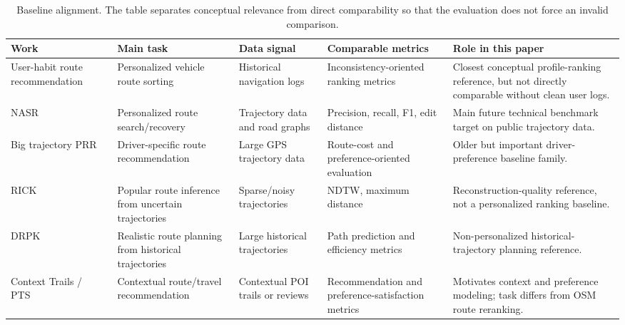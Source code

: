 \begin{table}[t]
  \centering
  \caption{Baseline alignment. The table separates conceptual relevance from direct comparability so that the evaluation does not force an invalid comparison.}
  \label{tab:baseline_alignment}
  \begin{tabular}{p{}p{}p{}p{}p{}}
    \toprule
    Work & Main task & Data signal & Comparable metrics & Role in this paper \\
    \midrule
    User-habit route recommendation~\cite{userhabits2024} & Personalized vehicle route sorting & Historical navigation logs & Inconsistency-oriented ranking metrics & Closest conceptual profile-ranking reference, but not directly comparable without clean user logs. \\
    NASR~\cite{nasr2019} & Personalized route search/recovery & Trajectory data and road graphs & Precision, recall, F1, edit distance & Main future technical benchmark target on public trajectory data. \\
    Big trajectory PRR~\cite{dai2015bigtrajectory} & Driver-specific route recommendation & Large GPS trajectory data & Route-cost and preference-oriented evaluation & Older but important driver-preference baseline family. \\
    RICK~\cite{chen2012popular} & Popular route inference from uncertain trajectories & Sparse/noisy trajectories & NDTW, maximum distance & Reconstruction-quality reference, not a personalized ranking baseline. \\
    DRPK~\cite{tian2023drpk} & Realistic route planning from historical trajectories & Large historical trajectories & Path prediction and efficiency metrics & Non-personalized historical-trajectory planning reference. \\
    Context Trails / PTS~\cite{contexttrails2025,wang2025pts} & Contextual route/travel recommendation & Contextual POI trails or reviews & Recommendation and preference-satisfaction metrics & Motivates context and preference modeling; task differs from OSM route reranking. \\
    \bottomrule
  \end{tabular}
\end{table}
